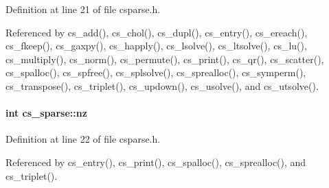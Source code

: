 Definition at line 21 of file csparse.\-h.



Referenced by cs\-\_\-add(), cs\-\_\-chol(), cs\-\_\-dupl(), cs\-\_\-entry(), cs\-\_\-ereach(), cs\-\_\-fkeep(), cs\-\_\-gaxpy(), cs\-\_\-happly(), cs\-\_\-lsolve(), cs\-\_\-ltsolve(), cs\-\_\-lu(), cs\-\_\-multiply(), cs\-\_\-norm(), cs\-\_\-permute(), cs\-\_\-print(), cs\-\_\-qr(), cs\-\_\-scatter(), cs\-\_\-spalloc(), cs\-\_\-spfree(), cs\-\_\-splsolve(), cs\-\_\-sprealloc(), cs\-\_\-symperm(), cs\-\_\-transpose(), cs\-\_\-triplet(), cs\-\_\-updown(), cs\-\_\-usolve(), and cs\-\_\-utsolve().

\hypertarget{structcs__sparse_a707363d7869d3fc4126027c1c9c7cf7c}{
\paragraph[{nz}]{\setlength{\rightskip}{0pt plus 5cm}int cs\-\_\-sparse\-::nz}}\label{structcs__sparse_a707363d7869d3fc4126027c1c9c7cf7c}


Definition at line 22 of file csparse.\-h.



Referenced by cs\-\_\-entry(), cs\-\_\-print(), cs\-\_\-spalloc(), cs\-\_\-sprealloc(), and cs\-\_\-triplet().

